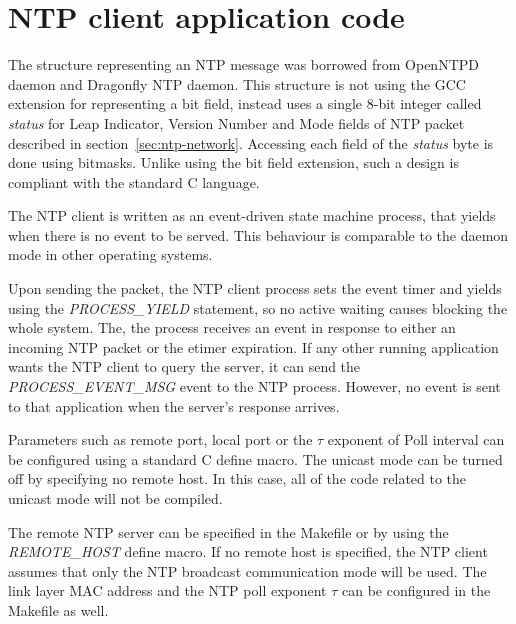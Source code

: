 
\section{NTP client application code}
The structure representing an NTP message was borrowed from OpenNTPD daemon
and Dragonfly NTP daemon.
This structure is not using the GCC extension for representing a bit field,
instead uses a single 8-bit integer called {\it{status}}
for Leap Indicator, Version Number and Mode fields of NTP packet
described in section~\ref{sec:ntp-network}.
Accessing each field of the {\it{status}} byte is done using bitmasks.
Unlike using the bit field extension,
such a design is compliant with the standard C language.

The NTP client is written as an event-driven state machine process,
that yields when there is no event to be served.
This behaviour is comparable to the daemon mode in other operating systems.

Upon sending the packet, the NTP client process sets the event timer and yields
using the {\it{PROCESS\_YIELD}} statement, so no active waiting
causes blocking the whole system.
The, the process receives an event in response to either an incoming NTP packet
or the etimer expiration.
If any other running application wants the NTP client to query the server,
it can send the {\it{PROCESS\_EVENT\_MSG}} event to the NTP process.
However, no event is sent to that application when the server's response arrives.

Parameters such as remote port, local port or the $\tau$ exponent of Poll interval
can be configured using a standard C define macro.
The unicast mode can be turned off by specifying no remote host.
In this case, all of the code related to the unicast mode will not be compiled.

The remote NTP server can be specified in the Makefile or
by using the {\it{REMOTE\_HOST}} define macro.
If no remote host is specified, the NTP client assumes that only the NTP broadcast communication mode will be used.
The link layer MAC address and the NTP poll exponent $\tau$
can be configured in the Makefile as well.



